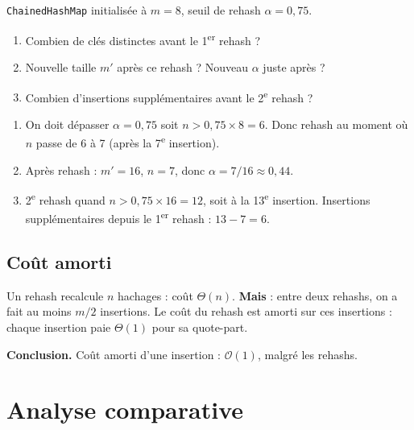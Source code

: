 \documentclass[11pt,a4paper]{article}
\newcommand{\bigO}{\mathcal{O}}
\begin{document}
\begin{appliboxQ}
\texttt{ChainedHashMap} initialisée à $m = 8$, seuil de rehash $\alpha = 0{,}75$.
\begin{enumerate}[nosep]
    \item Combien de clés distinctes avant le 1\textsuperscript{er} rehash ?
    \item Nouvelle taille $m'$ après ce rehash ? Nouveau $\alpha$ juste après ?
    \item Combien d'insertions supplémentaires avant le 2\textsuperscript{e} rehash ?
\end{enumerate}
\end{appliboxQ}

\begin{appliboxR}[Réponse]
\begin{enumerate}[nosep]
    \item On doit dépasser $\alpha = 0{,}75$ soit $n > 0{,}75 \times 8 = 6$. Donc rehash au moment où $n$ passe de 6 à 7 (après la 7\textsuperscript{e} insertion).
    \item Après rehash : $m' = 16$, $n = 7$, donc $\alpha = 7/16 \approx 0{,}44$.
    \item 2\textsuperscript{e} rehash quand $n > 0{,}75 \times 16 = 12$, soit à la 13\textsuperscript{e} insertion. Insertions supplémentaires depuis le 1\textsuperscript{er} rehash : $13 - 7 = 6$.
\end{enumerate}
\end{appliboxR}

\subsection{Coût amorti}

\begin{attentionbox}
Un rehash recalcule $n$ hachages : coût $\Theta(n)$. \textbf{Mais} : entre deux rehashs, on a fait au moins $m/2$ insertions. Le coût du rehash est amorti sur ces insertions : chaque insertion paie $\Theta(1)$ pour sa quote-part.

\medskip
\textbf{Conclusion.} Coût amorti d'une insertion : $\bigO(1)$, malgré les rehashs.
\end{attentionbox}

\section{Analyse comparative}
\end{document}
